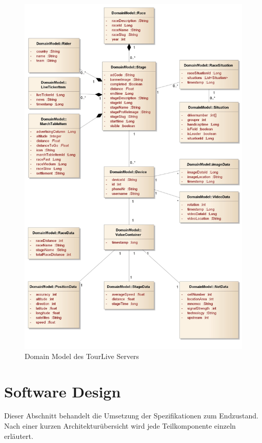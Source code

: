 \begin{figure}[H]
	\centering
	\includegraphics[width=130mm]{images/tourliveweb/TourLiveServer_DomainModel_ohneRand.jpg}
	\caption{Domain Model des TourLive Servers}
	\label{fig:tourliveserverdomainmodel}
\end{figure}
\newpage

\section{Software Design}
\label{sec:tourliveserversoftwaredesign}
Dieser Abschnitt behandelt die Umsetzung der Spezifikationen zum Endzustand. Nach einer kurzen Architekturübersicht wird jede Teilkomponente einzeln erläutert.

